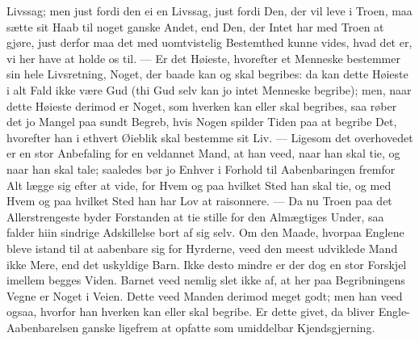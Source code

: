 \documentclass[12pt,a4paper]{book}
\begin{document}
Livssag; men just fordi den ei en Livssag, just fordi Den, der vil leve i Troen, maa
sætte sit Haab til noget ganske Andet, end Den, der Intet har med Troen at gjøre, just
derfor maa det med uomtvistelig Bestemthed kunne vides, hvad det er, vi her have at
holde os til. --- Er det Høieste, hvorefter et Menneske bestemmer sin hele Livsretning,
Noget, der baade kan
og skal begribes: da kan dette Høieste i alt Fald ikke være Gud (thi Gud selv kan jo
intet Menneske begribe); men, naar dette Høieste derimod er Noget, som hverken kan eller
skal begribes, saa røber det jo Mangel paa sundt Begreb, hvis Nogen spilder Tiden paa at
begribe Det, hvorefter han i ethvert Øieblik skal bestemme sit Liv. --- Ligesom det
overhovedet er en stor Anbefaling for en veldannet Mand, at han veed, naar han skal tie,
og naar han skal tale; saaledes bør jo Enhver i Forhold til Aabenbaringen fremfor Alt
lægge sig efter at vide, for Hvem og paa hvilket Sted han skal tie, og med Hvem og paa
hvilket Sted han har Lov at raisonnere. --- Da nu Troen paa det Allerstrengeste byder
Forstanden at tie stille for den Almægtiges Under, saa falder hiin sindrige Adskillelse
bort af sig selv. Om den Maade, hvorpaa Englene bleve istand til at aabenbare sig for
Hyrderne, veed den meest udviklede Mand ikke Mere, end det uskyldige Barn. Ikke desto
mindre er der dog en stor Forskjel imellem begges Viden. Barnet veed nemlig slet ikke
af, at her paa Begribningens Vegne er Noget i Veien. Dette veed Manden derimod meget
godt; men han veed ogsaa, hvorfor han hverken kan eller skal begribe. Er dette givet, da
bliver Engle-Aabenbarelsen ganske ligefrem at opfatte som umiddelbar Kjendsgjerning.
\end{document}
